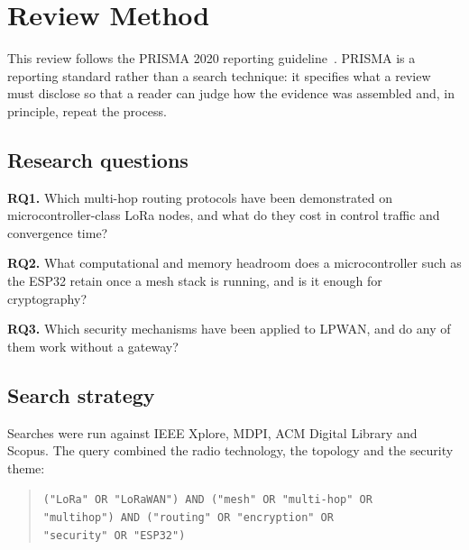 \documentclass[conference]{IEEEtran}
\begin{document}
\section{Review Method}\label{sec:method}

This review follows the PRISMA 2020 reporting guideline~\cite{prisma2021}. PRISMA
is a reporting standard rather than a search technique: it specifies what a
review must disclose so that a reader can judge how the evidence was assembled
and, in principle, repeat the process.

\subsection{Research questions}

\textbf{RQ1.} Which multi-hop routing protocols have been demonstrated on
microcontroller-class LoRa nodes, and what do they cost in control traffic and
convergence time?

\textbf{RQ2.} What computational and memory headroom does a microcontroller such
as the ESP32 retain once a mesh stack is running, and is it enough for
cryptography?

\textbf{RQ3.} Which security mechanisms have been applied to LPWAN, and do any of
them work without a gateway?

\subsection{Search strategy}

%
Searches were run against IEEE Xplore, MDPI, ACM Digital Library and Scopus. The
query combined the radio technology, the topology and the security theme:

\begin{quote}\small
\texttt{("LoRa" OR "LoRaWAN") AND ("mesh" OR "multi-hop" OR\\
"multihop") AND ("routing" OR "encryption" OR\\
"security" OR "ESP32")}
\end{quote}
\end{document}
